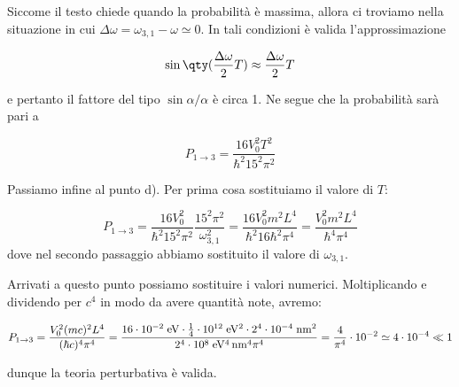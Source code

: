 \begin{soluzione}
   Siccome il testo chiede quando la probabilità è massima, allora ci troviamo nella situazione in cui $\Delta\omega=\omega_{3,1} - \omega \simeq 0$. In tali condizioni è valida l'approssimazione

   \begin{equation*}
      \sin{ \qty( \frac{\Delta \omega}{2} T ) }
      \approx \frac{\Delta \omega}{2} T
   \end{equation*}

   e pertanto il fattore del tipo $\sin{\alpha}/\alpha$ è circa 1. Ne segue che la probabilità sarà pari a

   \begin{equation*}
      P_{1 \to 3}
      =\frac{16 V_0^2 T^2}{\hbar^2 15^2 \pi^2}
   \end{equation*}
   
   Passiamo infine al punto d). Per prima cosa sostituiamo il valore di $T$:
   
   \begin{equation*}
      P_{1 \to 3}
      =\frac{16 V_0^2}{\hbar^2 15^2 \pi^2} \frac{15^2 \pi^2}{\omega_{3,1}^2}
      =\frac{16 V_0^2 m^2 L^4}{\hbar^2 16 \hbar^2 \pi^4}
      =\frac{V_0^2 m^2 L^4}{\hbar^4 \pi^4}
   \end{equation*}
   dove nel secondo passaggio abbiamo sostituito il valore di $\omega_{3,1}$.
   
   Arrivati a questo punto possiamo sostituire i valori numerici. Moltiplicando e dividendo per $c^4$ in modo da avere quantità note, avremo:

   \begin{equation*}
      P_{1 \to 3}
      =\frac{V_0^2 (mc)^2 L^4}{(\hbar c)^4 \pi^4}
      =\rm \frac{16 \cdot 10^{-2} \; eV \cdot \frac{1}{4} \cdot 10^{12} \; eV^2 \cdot 2^4 \cdot 10^{-4} \; nm^2}{2^4 \cdot 10^{8} \; eV^4 \, nm^4 \pi^4}
      =\frac{4}{\pi^4} \cdot 10^{-2}
      \simeq 4 \cdot 10^{-4}
      \ll 1
   \end{equation*}

   dunque la teoria perturbativa è valida.
\end{soluzione}

\setcounter{equation}{0}